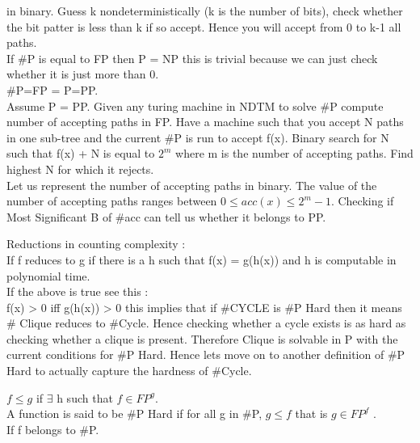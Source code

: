 \documentclass[solution,addpoints,12pt]{exam}
\begin{document}
in binary. Guess k nondeterministically (k is the number of bits), check
whether the bit patter is less than k if so accept. Hence you will accept from 0 to k-1
all paths.\\
If \#P is equal to FP then P = NP this is trivial because we can just check whether
it is just more than 0.\\
\#P=FP = P=PP.\\
Assume P = PP. Given any turing machine in NDTM to solve \#P compute number of
accepting paths in FP.
Have a machine such that you accept N paths in one sub-tree and the current \#P is run
to accept f(x).
Binary search for N such that f(x) + N is equal to $2^m$ where m is the number of
accepting paths.
Find highest N for which it rejects.\\

Let us represent the number of accepting paths in binary. The value of the number
of accepting paths ranges between $0 \le acc(x) \le 2^m - 1$. Checking if Most
Significant B of \#acc
can tell us whether it belongs to PP.

Reductions in counting complexity :\\
If f reduces to g if there is a h such that f(x) = g(h(x)) and h is computable in
polynomial time.\\
If the above  is true see this :\\
f(x) > 0 iff g(h(x)) > 0 this implies that if \#CYCLE is \#P Hard then it means \#
Clique reduces to \#Cycle. Hence checking whether a cycle exists is as hard as
checking whether a clique is present.
Therefore Clique is solvable in P with the current conditions for \#P Hard. Hence lets
move on to another
definition of \#P Hard to actually capture the hardness of \#Cycle.

$ f \le g $ if $\exists$ h such that $f \in {FP}^g$.\\
A function is said to be \#P Hard if for all g in \#P, $g \le f$ that is $g \in {FP}^f$
.\\
If f belongs to \#P.
\end{document}
